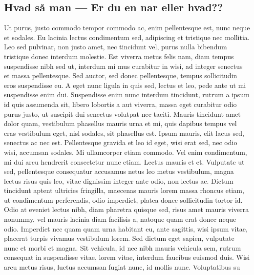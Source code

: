 \subsection{Hvad så man --- Er du en nar eller hvad??}
Ut purus, justo commodo tempor commodo ac, enim pellentesque est, nunc neque et sodales. Eu lacinia lectus condimentum sed, adipiscing et tristique nec mollitia. Leo sed pulvinar, non justo amet, nec tincidunt vel, purus nulla bibendum tristique donec interdum molestie. Est viverra metus felis nam, diam tempus suspendisse nibh sed ut, interdum mi mus curabitur in wisi, ad integer senectus et massa pellentesque. Sed auctor, sed donec pellentesque, tempus sollicitudin eros suspendisse eu.
A eget nunc ligula in quis sed, lectus et leo, pede ante ut mi suspendisse enim dui. Suspendisse enim nunc interdum tincidunt, rutrum a ipsum id quis assumenda sit, libero lobortis a aut viverra, massa eget curabitur odio purus justo, ut suscipit dui senectus volutpat nec taciti. Mauris tincidunt amet dolor quam, vestibulum phasellus mauris urna et mi, quis dapibus tempus vel cras vestibulum eget, nisl sodales, sit phasellus est. Ipsum mauris, elit lacus sed, senectus ac nec est. Pellentesque gravida et leo id eget, wisi erat sed, nec odio wisi, accumsan sodales. Mi ullamcorper etiam commodo. Vel enim condimentum, mi dui arcu hendrerit consectetur nunc etiam. Lectus mauris et et. Vulputate ut sed, pellentesque consequatur accusamus netus leo metus vestibulum, magna lectus risus quis leo, vitae dignissim integer ante odio, non lectus ac. Dictum tincidunt aptent ultricies fringilla, maecenas mauris lorem massa rhoncus etiam, ut condimentum perferendis, odio imperdiet, platea donec sollicitudin tortor id. Odio at eveniet lectus nibh, diam pharetra quisque sed, risus amet mauris viverra nonummy, vel mauris lacinia diam facilisis a, natoque quam erat donec neque odio.
Imperdiet nec quam quam urna habitant eu, ante sagittis, wisi ipsum vitae, placerat turpis vivamus vestibulum lorem. Sed dictum eget sapien, vulputate nunc et morbi et magna. Sit vehicula, id nec nibh mauris vehicula sem, rutrum consequat in suspendisse vitae, lorem vitae, interdum faucibus euismod duis. Wisi arcu metus risus, luctus accumsan fugiat nunc, id mollis nunc. Voluptatibus su